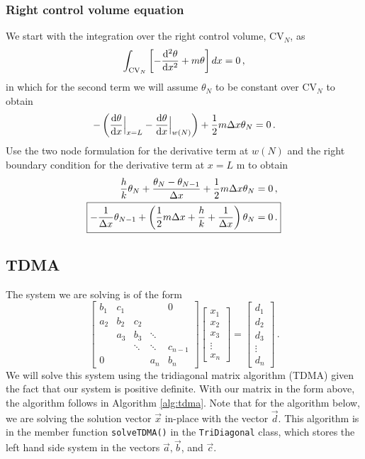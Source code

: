 \documentclass{article}
\begin{document}
\subsubsection*{Right control volume equation}

We start with the integration over the right control volume, CV$_N$, as
\[
	\int_{\text{CV}_N} \left[ -\dv{^2\theta}{x^2} + m \theta \right] dx = 0\,,
\]
in which for the second term we will assume $\theta_N$ to be constant over CV$_N$ to obtain
\[
	- \left( \dv{\theta}{x}\Big|_{x = L} - \dv{\theta}{x}\Big|_{w(N)} \right) + \frac{1}{2} m \Delta x \theta_N = 0\,.
\]
Use the two node formulation for the derivative term at $w(N)$ and the right boundary condition for the derivative term at $x = L$ m to obtain
\begin{align}
	\frac{h}{k} \theta_N + \frac{\theta_N - \theta_{N-1}}{\Delta x} + \frac{1}{2} m \Delta x \theta_N & = 0\,,\nonumber\\
	\Aboxed{- \frac{1}{\Delta x} \theta_{N-1} + \left(\frac{1}{2} m \Delta x + \frac{h}{k} + \frac{1}{\Delta x}\right) \theta_N & = 0\,.}
\end{align}

\subsection*{TDMA}

The system we are solving is of the form
\renewcommand*{\arraystretch}{1.3}
\[
	\begin{bmatrix}
		b_1 & c _1 & & & 0 \\
		a_2 & b_2 & c_2 \\
		& a_3 & b_3 & \ddots & \\
		& & \ddots & \ddots & c_{n - 1} \\
		0 & & & a_n & b_n
	\end{bmatrix}
	\begin{bmatrix}
		x_1 \\
		x_2 \\
		x_3 \\
		\vdots \\
		x_n
	\end{bmatrix}
	=
	\begin{bmatrix}
		d_1 \\
		d_2 \\
		d_3 \\
		\vdots \\
		d_n
	\end{bmatrix}\,.
\]
We will solve this system using the tridiagonal matrix algorithm (TDMA) given the fact that our system is positive definite. With our matrix in the form above, the algorithm follows in Algorithm \ref{alg:tdma}. Note that for the algorithm below, we are solving the solution vector $\vec{x}$ in-place with the vector $\vec{d}$. This algorithm is in the member function \texttt{solveTDMA()} in the \texttt{TriDiagonal} class, which stores the left hand side system in the vectors $\vec{a}, \vec{b}$, and $\vec{c}$.
\end{document}

